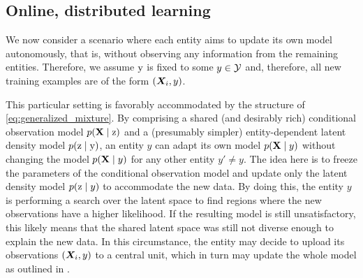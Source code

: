 \subsection{Online, distributed learning}
\label{sec:distributed_learning}

We now consider a scenario where each entity aims to update its own model autonomously, that is, without observing any information from the remaining entities. Therefore, we assume ${\textnormal{y}}$ is fixed to some $y \in {\mathcal{Y}}$ and, therefore, all new training examples are of the form $({\bm{X}}_i, y)$.

This particular setting is favorably accommodated by the structure of \eqref{eq:generalized_mixture}. By comprising a shared (and desirably rich) conditional observation model $p({\mathbf{X}} \mid {\textnormal{z}})$ and a (presumably simpler) entity-dependent latent density model $p({\textnormal{z}} \mid {\textnormal{y}})$, an entity $y$ can adapt its own model $p({\mathbf{X}} \mid y)$ without changing the model $p({\mathbf{X}} \mid y)$ for any other entity $y' \neq y$. The idea here is to freeze the parameters of the conditional observation model and update only the latent density model $p({\textnormal{z}} \mid y)$ to accommodate the new data. By doing this, the entity $y$ is performing a search over the latent space to find regions where the new observations have a higher likelihood. If the resulting model is still unsatisfactory, this likely means that the shared latent space was still not diverse enough to explain the new data. In this circumstance, the entity may decide to upload its observations $({\bm{X}}_i, y)$ to a central unit, which in turn may update the whole model as outlined in .
